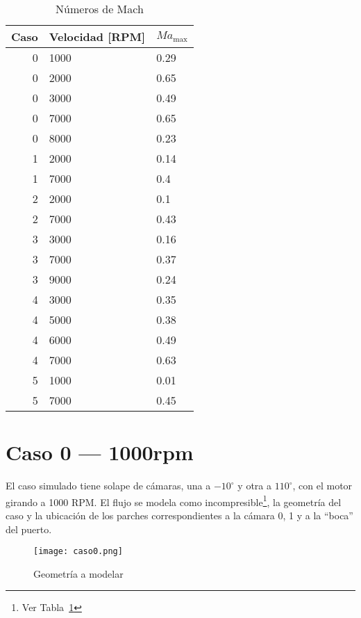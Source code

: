 \begin{table}
    \centering
    \begin{tabular}{rll}\toprule
        Caso & Velocidad [RPM] & $Ma_{\max}$ \\ \midrule
        0 & 1000 & 0.29 \\
        0 & 2000 & 0.65 \\
        0 & 3000 & 0.49 \\
        0 & 7000 & 0.65 \\
        0 & 8000 & 0.23 \\
        1 & 2000 & 0.14 \\
        1 & 7000 & 0.4 \\
        2 & 2000 & 0.1 \\
        2 & 7000 & 0.43 \\
        3 & 3000 & 0.16 \\
        3 & 7000 & 0.37 \\
        3 & 9000 & 0.24 \\
        4 & 3000 & 0.35 \\
        4 & 5000 & 0.38 \\
        4 & 6000 & 0.49 \\
        4 & 7000 & 0.63 \\
        5 & 1000 & 0.01 \\
        5 & 7000 & 0.45 \\ \bottomrule
    \end{tabular}
    \caption{Números de Mach}\label{tab:mach}
\end{table}

\section{Caso 0 --- 1000rpm}

El caso simulado tiene solape de cámaras, una a $-10^{\circ}$ y otra a
$110^{\circ}$, con el motor girando a 1000 RPM.
%
El flujo se modela como incompresible\footnote{Ver Tabla~\ref{tab:mach}}, la
geometría del caso y la ubicación de los parches correspondientes a la cámara
0, 1 y a la ``boca'' del puerto.

\begin{figure}
    \centering
    \texttt{[image: caso0.png]}
    \caption{Geometría a modelar}\label{fig:caso0}
\end{figure}

